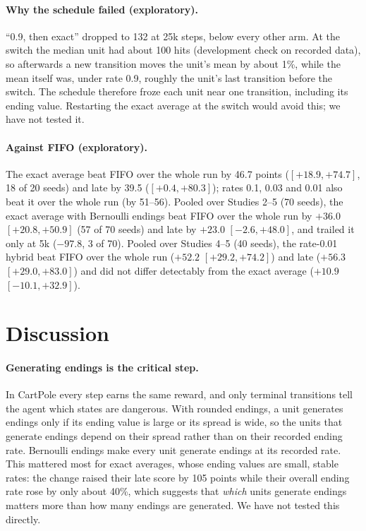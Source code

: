 \documentclass{article}
\begin{document}
\paragraph{Why the schedule failed (exploratory).} ``0.9, then exact''
dropped to 132 at 25k steps, below every other arm. At the switch the median
unit had about 100 hits (development check on recorded data), so afterwards
a new transition moves the unit's mean by about 1\%, while the mean itself
was, under rate 0.9, roughly the unit's last transition before the switch.
The schedule therefore froze each unit near one transition, including its
ending value. Restarting the exact average at the switch would avoid this;
we have not tested it.

\paragraph{Against FIFO (exploratory).} The exact average beat FIFO over the
whole run by 46.7 points ($[+18.9, +74.7]$, 18 of 20 seeds) and late by 39.5
($[+0.4, +80.3]$); rates 0.1, 0.03 and 0.01 also beat it over the whole run
(by 51--56). Pooled over Studies 2--5 (70 seeds), the exact average with
Bernoulli endings beat FIFO over the whole run by $+36.0$ $[+20.8, +50.9]$
(57 of 70 seeds) and late by $+23.0$ $[-2.6, +48.0]$, and trailed it only at
5k ($-97.8$, 3 of 70). Pooled over Studies 4--5 (40 seeds), the rate-0.01
hybrid beat FIFO over the whole run ($+52.2$ $[+29.2, +74.2]$) and late
($+56.3$ $[+29.0, +83.0]$) and did not differ detectably from the exact
average ($+10.9$ $[-10.1, +32.9]$).

\section{Discussion}
\label{sec:discussion}

\paragraph{Generating endings is the critical step.} In CartPole every step
earns the same reward, and only terminal transitions tell the agent which
states are dangerous. With rounded endings, a unit generates endings only if
its ending value is large or its spread is wide, so the units that generate
endings depend on their spread rather than on their recorded ending rate.
Bernoulli endings make every unit generate endings at its recorded rate.
This mattered most for exact averages, whose ending values are small, stable
rates: the change raised their late score by 105 points while their overall
ending rate rose by only about 40\%, which suggests that \emph{which} units
generate endings matters more than how many endings are generated. We have
not tested this directly.
\end{document}
